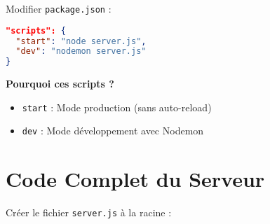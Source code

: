 \documentclass[12pt,a4paper]{article}
\begin{document}
Modifier \texttt{package.json} :

\begin{lstlisting}[language=json]
"scripts": {
  "start": "node server.js",
  "dev": "nodemon server.js"
}
\end{lstlisting}

\textbf{Pourquoi ces scripts ?}
\begin{itemize}
    \item \texttt{start} : Mode production (sans auto-reload)
    \item \texttt{dev} : Mode développement avec Nodemon
\end{itemize}

\section{Code Complet du Serveur}

Créer le fichier \texttt{server.js} à la racine :
\end{document}
